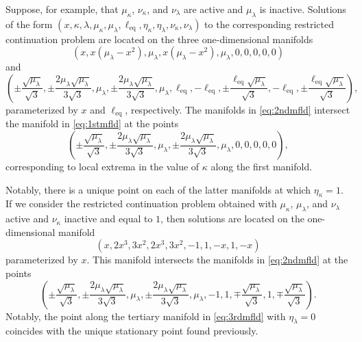 Suppose, for example, that $\mu_\kappa$, $\nu_\kappa$, and $\nu_\lambda$ are active and $\mu_\lambda$ is inactive. Solutions of the form $\left(x,\kappa,\lambda,\mu_\kappa,\mu_\lambda,\ell_\mathrm{eq},\eta_\kappa,\eta_\lambda,\nu_\kappa,\nu_\lambda\right)$ to the corresponding restricted continuation problem are located on the three one-dimensional manifolds
\begin{equation}
\label{eq:1stmfld}
\left(x,x(\mu_\lambda-x^2),\mu_\lambda,x(\mu_\lambda-x^2),\mu_\lambda,0,0,0,0,0\right)
\end{equation}
and
\begin{equation}
\label{eq:2ndmfld}
\left(\pm\frac{\sqrt{\mu_\lambda}}{\sqrt{3}},\pm\frac{2\mu_\lambda\sqrt{\mu_\lambda}}{3\sqrt{3}},\mu_\lambda,\pm\frac{2\mu_\lambda\sqrt{\mu_\lambda}}{3\sqrt{3}},\mu_\lambda,\ell_\mathrm{eq},-\ell_\mathrm{eq},\pm\frac{\ell_\mathrm{eq}\sqrt{\mu_\lambda}}{\sqrt{3}},-\ell_\mathrm{eq},\pm\frac{\ell_\mathrm{eq}\sqrt{\mu_\lambda}}{\sqrt{3}}\right),
\end{equation}
parameterized by $x$ and $\ell_\mathrm{eq}$, respectively. The manifolds in \eqref{eq:2ndmfld} intersect the manifold in \eqref{eq:1stmfld} at the points
\begin{equation}
\left(\pm\frac{\sqrt{\mu_\lambda}}{\sqrt{3}},\pm\frac{2\mu_\lambda\sqrt{\mu_\lambda}}{3\sqrt{3}},\mu_\lambda,\pm\frac{2\mu_\lambda\sqrt{\mu_\lambda}}{3\sqrt{3}},\mu_\lambda,0,0,0,0,0\right),
\end{equation}
corresponding to local extrema in the value of $\kappa$ along the first manifold.

Notably, there is a unique point on each of the latter manifolds at which $\eta_\kappa=1$. If we consider the restricted continuation problem obtained with $\mu_\kappa$, $\mu_\lambda$, and $\nu_\lambda$ active and $\nu_\kappa$ inactive and equal to $1$, then solutions are located on the one-dimensional manifold
\begin{equation}
\label{eq:3rdmfld}
\left(x,2x^3,3x^2,2x^3,3x^2,-1,1,-x,1,-x\right)
\end{equation}
parameterized by $x$. This manifold intersects the manifolds in \eqref{eq:2ndmfld} at the points
\begin{equation}
\left(\pm\frac{\sqrt{\mu_\lambda}}{\sqrt{3}},\pm\frac{2\mu_\lambda\sqrt{\mu_\lambda}}{3\sqrt{3}},\mu_\lambda,\pm\frac{2\mu_\lambda\sqrt{\mu_\lambda}}{3\sqrt{3}},\mu_\lambda,-1,1,\mp\frac{\sqrt{\mu_\lambda}}{\sqrt{3}},1,\mp\frac{\sqrt{\mu_\lambda}}{\sqrt{3}}\right).
\end{equation}
Notably, the point along the tertiary manifold in \eqref{eq:3rdmfld} with $\eta_\lambda=0$ coincides with the unique stationary point found previously.


